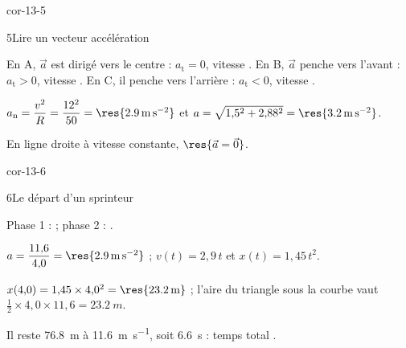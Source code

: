 \begin{blocLivre}{cor-13-5}
\begin{corrige}{5}{Lire un vecteur accélération}
\begin{questions}
\item En A, $\vec{a}$ est dirigé vers le centre : $a_\mathrm{t}=0$, vitesse . En B, $\vec{a}$ penche
vers l'avant : $a_\mathrm{t}>0$, vitesse . En C, il penche vers l'arrière : $a_\mathrm{t}<0$,
vitesse .
\item $a_\mathrm{n}=\dfrac{v^2}{R}=\dfrac{12^2}{50}=\res{\qty{2,9}{m.s^{-2}}}$ et
$a=\sqrt{1{,}5^2+2{,}88^2}=\res{\qty{3,2}{m.s^{-2}}}$.
\item En ligne droite à vitesse constante, $\res{\vec{a}=\vec{0}}$.
\end{questions}
\end{corrige}
\end{blocLivre}
\begin{blocLivre}{cor-13-6}
\begin{corrige}{6}{Le départ d'un sprinteur}
\begin{questions}
\item Phase 1 :  ; phase 2 : .
\item $a=\dfrac{11{,}6}{4{,}0}=\res{\qty{2,9}{m.s^{-2}}}$ ; $v(t)=2{,}9\,t$ et $x(t)=1{,}45\,t^2$.
\item $x(4{,}0)=1{,}45\times4{,}0^2=\res{\qty{23,2}{m}}$ ; l'aire du triangle sous la courbe vaut
$\frac12\times4{,}0\times11{,}6=\qty{23,2}{m}$.
\item Il reste \qty{76,8}{m} à \qty{11,6}{m.s^{-1}}, soit \qty{6,6}{s} : temps total .
\end{questions}
\end{corrige}
\end{blocLivre}
